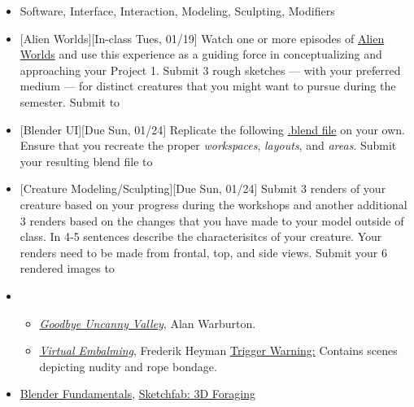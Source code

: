 \def\dMon{Mon, 01/18}
\def\dTues{Tues, 01/19}
\def\dWed{Wed, 01/20}
\def\dThur{Thur, 01/21}
\def\dFri{Fri, 01/22}
\def\dSat{Sat, 01/23}
\def\dSun{Sun, 01/24}
\placeDate

\begin{itemize}[noitemsep,topsep=0pt,leftmargin=*]
      \item {} Software, Interface, Interaction, Modeling, Sculpting, Modifiers
      \item {}[Alien Worlds][In-class \dTues] \newline Watch one or more episodes of \href{https://www.netflix.com/title/80221410}{Alien Worlds} and use this experience as a guiding force in conceptualizing and approaching your Project 1. Submit 3 rough sketches --- with your preferred medium --- for distinct creatures that you might want to pursue during the semester. Submit to 
      \item {}[Blender UI][Due \dSun] Replicate the following \href{\#}{.blend file} on your own. Ensure that you recreate the proper \emph{workspaces}, \emph{layouts}, and \emph{areas}. Submit your resulting blend file to \discordE
      \item {}[Creature Modeling/Sculpting][Due \dSun] Submit 3 renders of your creature based on your progress during the workshops and another additional 3 renders based on the changes that you have made to your model outside of class. In 4-5 sentences describe the characterisitcs of your creature. Your renders need to be made from frontal, top, and side views. Submit your 6 rendered images to \discordE
      \item {}
            \begin{itemize}
                  \item \href{https://alanwarburton.co.uk/goodbye-uncanny-valley}{\emph{Goodbye Uncanny Valley}}, Alan Warburton.
                  \item \href{https://www.nowness.com/story/virtual-embalming-frederik-heyman}{\emph{Virtual Embalming}}, Frederik Heyman \newline
                        \small{\ul{Trigger Warning:} Contains scenes depicting nudity and rope bondage.}
            \end{itemize}
      \item {} \href{https://cloud.blender.org/p/blender-fundamentals/}{Blender Fundamentals}, \href{https://sketchfab.com/search?features\=downloadable\&q\=scan+heritage\&sort\_by\=-relevance\&type\=models}{Sketchfab: 3D Foraging}
\end{itemize}